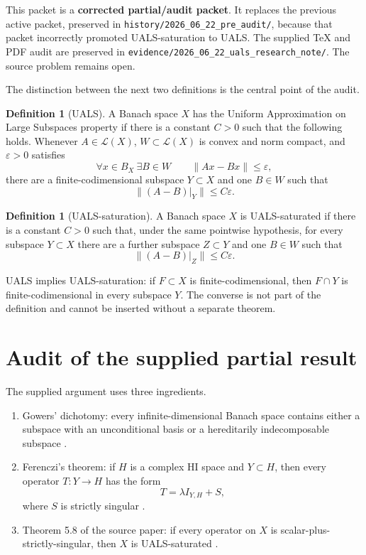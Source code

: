 \documentclass[11pt]{article}
\theoremstyle{definition}
\newtheorem{definition}[theorem]{Definition}
\theoremstyle{remark}
\newcommand{\LL}{\mathcal{L}}
\begin{document}
\clearpage
This packet is a \textbf{corrected partial/audit packet}.  It replaces the
previous active packet, preserved in \nolinkurl{history/2026_06_22_pre_audit/},
because that packet incorrectly promoted UALS-saturation to UALS.  The
supplied TeX and PDF audit are preserved in
\nolinkurl{evidence/2026_06_22_uals_research_note/}.  The source problem
remains open.

The distinction between the next two definitions is the central point of the audit.

\begin{definition}[UALS]\label{def:uals}
A Banach space $X$ has the Uniform Approximation on Large Subspaces property if there is a constant $C>0$ such that the following holds.  Whenever $A\in\LL(X)$, $W\subset\LL(X)$ is convex and norm compact, and $\varepsilon>0$ satisfies
\[
  \forall x\in B_X\ \exists B\in W\qquad \|Ax-Bx\|\leq \varepsilon,
\]
there are a finite-codimensional subspace $Y\subset X$ and one $B\in W$ such that
\[
  \|(A-B)|_Y\|\leq C\varepsilon.
\]
\end{definition}

\begin{definition}[UALS-saturation]\label{def:saturated}
A Banach space $X$ is UALS-saturated if there is a constant $C>0$ such that, under the same pointwise hypothesis, for every subspace $Y\subset X$ there are a further subspace $Z\subset Y$ and one $B\in W$ such that
\[
  \|(A-B)|_Z\|\leq C\varepsilon.
\]
\end{definition}

UALS implies UALS-saturation: if $F\subset X$ is finite-codimensional, then $F\cap Y$ is finite-codimensional in every subspace $Y$.  The converse is not part of the definition and cannot be inserted without a separate theorem.

\section{Audit of the supplied partial result}

The supplied argument uses three ingredients.

\begin{enumerate}[label=(\roman*),leftmargin=2.2em]
\item Gowers' dichotomy: every infinite-dimensional Banach space contains either a subspace with an unconditional basis or a hereditarily indecomposable subspace \cite{Gowers,FK}.
\item Ferenczi's theorem: if $H$ is a complex HI space and $Y\subset H$, then every operator $T:Y\to H$ has the form
\[
  T=\lambda I_{Y,H}+S,
\]
where $S$ is strictly singular \cite{Ferenczi}.
\item Theorem 5.8 of the source paper: if every operator on $X$ is scalar-plus-strictly-singular, then $X$ is UALS-saturated \cite[Theorem 5.8]{AGLM}.
\end{enumerate}
\end{document}
